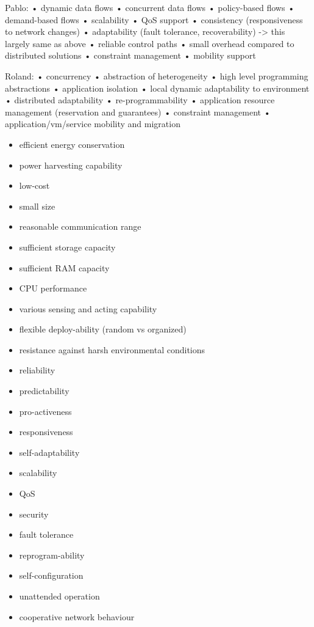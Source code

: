 Pablo:
• dynamic data flows
• concurrent data flows
• policy-based flows
• demand-based flows
• scalability
• QoS support
• consistency (responsiveness to network changes)
• adaptability (fault tolerance, recoverability) -> this largely same as above
• reliable control paths
• small overhead compared to distributed solutions
• constraint management
• mobility support

Roland:
• concurrency
• abstraction of heterogeneity
• high level programming abstractions
• application isolation
• local dynamic adaptability to environment
• distributed adaptability
• re-programmability
• application resource management (reservation and guarantees)
• constraint management
• application/vm/service mobility and migration


\begin{itemize}
\item efficient energy conservation
\item power harvesting capability
\item low-cost
\item small size
\item reasonable communication range

\item sufficient storage capacity
\item sufficient RAM capacity
\item CPU performance
\item various sensing and acting capability


\item flexible deploy-ability (random vs organized)
\item resistance against harsh environmental conditions
\item reliability
\item predictability
\item pro-activeness
\item responsiveness
\item self-adaptability
\item scalability
\item QoS
\item security
\item fault tolerance
\item reprogram-ability 
\item self-configuration
\item unattended operation
\item cooperative network behaviour 
\end{itemize}


